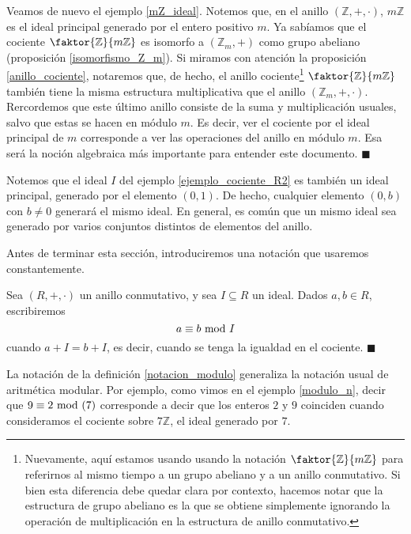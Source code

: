 \begin{example} \label{modulo_n}
Veamos de nuevo el ejemplo \ref{mZ_ideal}. Notemos que, en el anillo $(\mathbb{Z}, +, \cdot)$, $m\mathbb{Z}$ es el ideal principal generado por el entero positivo $m$. Ya sabíamos que el cociente $\faktor{\mathbb{Z}}{m\mathbb{Z}}$ es isomorfo a $(\mathbb{Z}_m, +)$ como grupo abeliano (proposición \ref{isomorfismo_Z_m}). Si miramos con atención la proposición \ref{anillo_cociente}, notaremos que, de hecho, el anillo cociente\footnote{Nuevamente, aquí estamos usando usando la notación $\faktor{\mathbb{Z}}{m\mathbb{Z}}$ para referirnos al mismo tiempo a un grupo abeliano y a un anillo conmutativo. Si bien esta diferencia debe quedar clara por contexto, hacemos notar que la estructura de grupo abeliano es la que se obtiene simplemente ignorando la operación de multiplicación en la estructura de anillo conmutativo.} $\faktor{\mathbb{Z}}{m\mathbb{Z}}$ también tiene la misma estructura multiplicativa que el anillo $(\mathbb{Z}_m, +, \cdot)$. Rercordemos que este último anillo consiste de la suma y multiplicación usuales, salvo que estas se hacen en módulo $m$. Es decir, ver el cociente por el ideal principal de $m$ corresponde a ver las operaciones del anillo en módulo $m$. Esa será la noción algebraica más importante para entender este documento. \hfill$\blacksquare$
\end{example}

Notemos que el ideal $I$ del ejemplo \ref{ejemplo_cociente_R2} es también un ideal principal, generado por el elemento $(0, 1)$. De hecho, cualquier elemento $(0, b)$ con $b \neq 0$ generará el mismo ideal. En general, es común que un mismo ideal sea generado por varios conjuntos distintos de elementos del anillo.

Antes de terminar esta sección, introduciremos una notación que usaremos constantemente.

\begin{definition} \label{notacion_modulo}
Sea $(R, +, \cdot)$ un anillo conmutativo, y sea $I \subseteq R$ un ideal. Dados $a, b \in R$, escribiremos
$$a \equiv b \!\! \mod I$$
cuando $a + I = b + I$, es decir, cuando se tenga la igualdad en el cociente. \hfill$\blacksquare$
\end{definition}

La notación de la definición \ref{notacion_modulo} generaliza la notación usual de aritmética modular. Por ejemplo, como vimos en el ejemplo \ref{modulo_n}, decir que $9 \equiv 2 \!\! \mod (7)$ corresponde a decir que los enteros $2$ y $9$ coinciden cuando consideramos el cociente sobre $7\mathbb{Z}$, el ideal generado por $7$.

